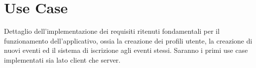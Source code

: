 \section{Use Case}
Dettaglio dell'implementazione dei requisiti ritenuti fondamentali per il funzionamento dell'applicativo, ossia la creazione dei profili utente, la creazione di nuovi eventi ed il sistema di iscrizione agli eventi stessi. Saranno i primi use case implementati sia lato client che server.
